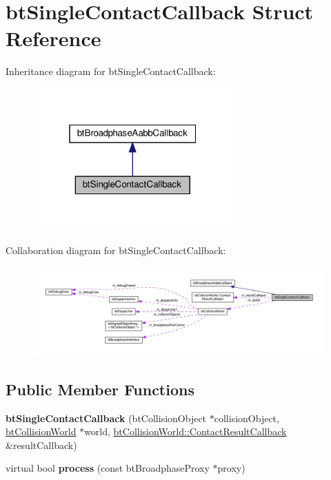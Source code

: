 \hypertarget{structbtSingleContactCallback}{}\section{bt\+Single\+Contact\+Callback Struct Reference}
\label{structbtSingleContactCallback}


Inheritance diagram for bt\+Single\+Contact\+Callback\+:
\nopagebreak
\begin{figure}[H]
\begin{center}
\leavevmode
\includegraphics[width=217pt]{structbtSingleContactCallback__inherit__graph}
\end{center}
\end{figure}


Collaboration diagram for bt\+Single\+Contact\+Callback\+:
\nopagebreak
\begin{figure}[H]
\begin{center}
\leavevmode
\includegraphics[width=350pt]{structbtSingleContactCallback__coll__graph}
\end{center}
\end{figure}
\subsection*{Public Member Functions}
\begin{DoxyCompactItemize}
\item 
\mbox{\label{structbtSingleContactCallback_a9c6c4b7e863c6a01053a08e882937416}} 
{\bfseries bt\+Single\+Contact\+Callback} (bt\+Collision\+Object $\ast$collision\+Object, \hyperlink{classbtCollisionWorld}{bt\+Collision\+World} $\ast$world, \hyperlink{structbtCollisionWorld_1_1ContactResultCallback}{bt\+Collision\+World\+::\+Contact\+Result\+Callback} \&result\+Callback)
\item 
\mbox{\label{structbtSingleContactCallback_aa08708f3a017a15d76ee4869dd4eb0b2}} 
virtual bool {\bfseries process} (const bt\+Broadphase\+Proxy $\ast$proxy)
\end{DoxyCompactItemize}
